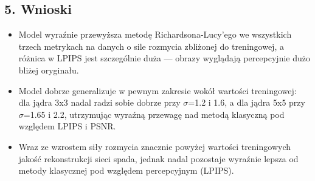 \documentclass[11pt,a4paper]{article}
\begin{document}
\subsection*{5. Wnioski}
\begin{itemize}
\item Model wyraźnie przewyższa metodę Richardsona-Lucy'ego we wszystkich trzech metrykach na danych o sile rozmycia zbliżonej do treningowej, a różnica w LPIPS jest szczególnie duża --- obrazy wyglądają percepcyjnie dużo bliżej oryginału.
\item Model dobrze generalizuje w pewnym zakresie wokół wartości treningowej: dla jądra 3x3 nadal radzi sobie dobrze przy \ensuremath{\sigma}=1.2 i 1.6, a dla jądra 5x5 przy \ensuremath{\sigma}=1.65 i 2.2, utrzymując wyraźną przewagę nad metodą klasyczną pod względem LPIPS i PSNR.
\item Wraz ze wzrostem siły rozmycia znacznie powyżej wartości treningowych jakość rekonstrukcji sieci spada, jednak nadal pozostaje wyraźnie lepsza od metody klasycznej pod względem percepcyjnym (LPIPS).
\end{itemize}
\endgroup
\end{document}
